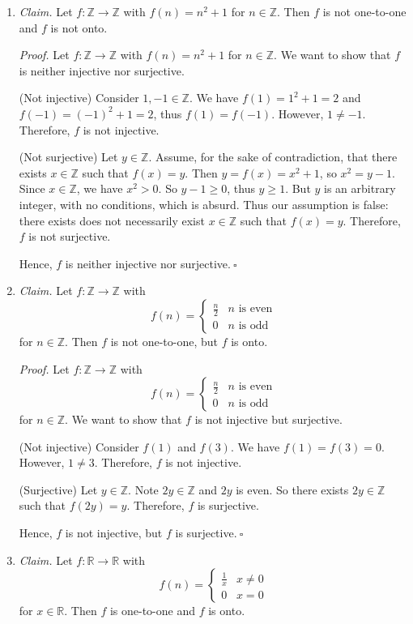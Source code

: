 \documentclass{article}
\newcommand{\Z}{\mathbb{Z}}
\newcommand{\R}{\mathbb{R}}
\theoremstyle{definition}
\begin{document}
\begin{solution}
\begin{enumerate}
\item\textit{Claim. }Let $f:\Z\to\Z$ with $f(n)=n^2+1$ for $n\in\Z$. Then $f$ is not one-to-one and $f$ is not onto.\newline

\textit{Proof. }Let $f:\Z\to\Z$ with $f(n)=n^2+1$ for $n\in\Z$. We want to show that $f$ is neither injective nor surjective.

(Not injective) Consider $1,-1\in\Z$. We have $f(1)=1^2+1=2$ and $f(-1)=(-1)^2+1=2$, thus $f(1)=f(-1)$. However, $1\neq -1$. Therefore, $f$ is not injective.

(Not surjective) Let $y\in\Z$. Assume, for the sake of contradiction, that there exists $x\in\Z$ such that $f(x)=y$. Then $y=f(x)=x^2+1$, so $x^2=y-1$. Since $x\in\Z$, we have $x^2>0$. So $y-1\geq 0$, thus $y\geq 1$. But $y$ is an arbitrary integer, with no conditions, which is absurd. Thus our assumption is false: there exists does not necessarily exist $x\in\Z$ such that $f(x)=y$. Therefore, $f$ is not surjective.

Hence, $f$ is neither injective nor surjective.$~\square$
\item\textit{Claim. }Let $f:\Z\to\Z$ with 
\[f(n) = \begin{cases} 
\frac{n}{2}&n\text{ is even}\\
0&n\text{ is odd}
\end{cases}
\]
for $n\in\Z$. Then $f$ is not one-to-one, but $f$ is onto.\newline

\textit{Proof. }Let $f:\Z\to\Z$ with 
\[f(n) = \begin{cases} 
\frac{n}{2}&n\text{ is even}\\
0&n\text{ is odd}
\end{cases}
\]
for $n\in\Z$. We want to show that $f$ is not injective but surjective.

(Not injective) Consider $f(1)$ and $f(3)$. We have $f(1)=f(3)=0$. However, $1\neq 3$. Therefore, $f$ is not injective.

(Surjective) Let $y\in\Z$. Note $2y\in\Z$ and $2y$ is even. So there exists $2y\in\Z$ such that $f(2y)=y$. Therefore, $f$ is surjective.

Hence, $f$ is not injective, but $f$ is surjective.$~\square$
\item\textit{Claim. }Let $f:\R\to\R$ with 
\[f(n) = \begin{cases} 
\frac{1}{x}&x\neq 0\\
0&x=0
\end{cases}
\]
for $x\in\R$. Then $f$ is one-to-one and $f$ is onto.\newline


\end{enumerate}
\end{solution}
\end{document}
